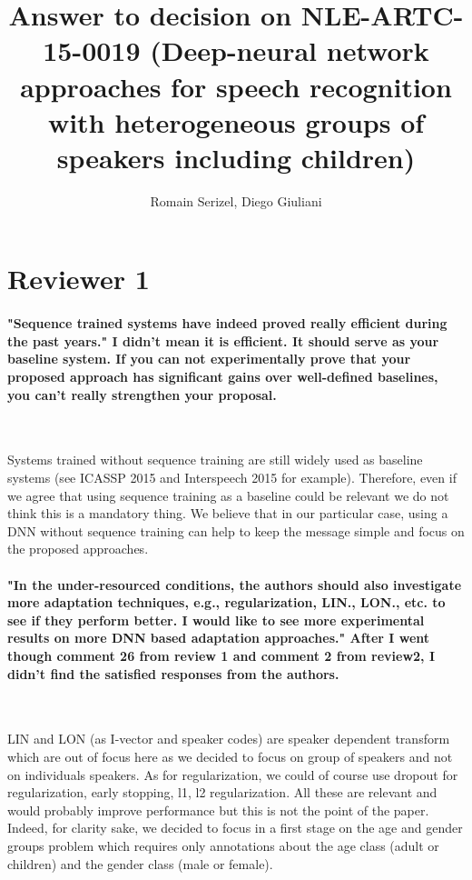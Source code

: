\documentclass[]{article}
\title{Answer to decision on NLE-ARTC-15-0019 (Deep-neural network approaches for speech recognition with heterogeneous groups of speakers including children)}
\author{Romain Serizel, Diego Giuliani}
\begin{document}
\maketitle


\section{Reviewer 1}
\paragraph{"Sequence trained systems have indeed proved really efficient during the past years." I didn't mean it is efficient. It should serve as your baseline system. If you can not experimentally prove that your proposed approach has significant gains over well-defined baselines, you can't really strengthen your proposal.}

~

Systems trained without sequence training are still widely used as baseline systems (see ICASSP 2015 and Interspeech 2015 for example). Therefore, even if we agree that using sequence training as a baseline could be relevant we do not think this is a mandatory thing. We believe that in our particular case, using a DNN without sequence training can help to keep the message simple and focus on the proposed approaches.
\paragraph{"In the under-resourced conditions, the authors should also investigate more adaptation techniques, e.g., regularization, LIN., LON., etc. to see if they perform better. I would like to see more experimental results on more DNN based adaptation approaches." After I went though comment 26 from review 1 and comment 2 from review2, I didn't find the satisfied responses from the authors.}

~

LIN and LON (as I-vector and speaker codes) are speaker dependent transform which are out of focus here as we decided to focus on group of speakers and not on individuals speakers. As for regularization, we could of course use dropout for regularization, early stopping, l1, l2 regularization. All these are relevant and would probably improve performance but this is not the point of the paper. Indeed, for clarity sake, we decided to focus in a first stage on the age and gender groups problem which requires only annotations about the age class (adult or children) and the gender class (male or female). 
\end{document}
